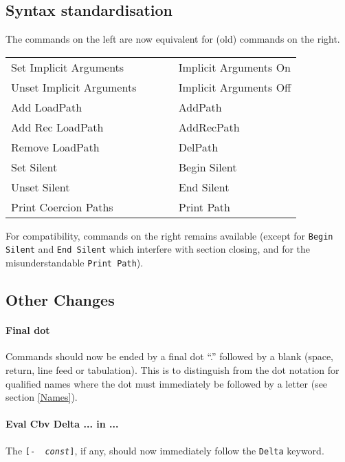 \documentclass[11pt]{article}
\begin{document}
\subsection{Syntax standardisation}

The commands on the left are now equivalent for (old) commands on
the right.

\medskip

\begin{tt}
\begin{tabular}{ll}
Set Implicit Arguments & Implicit Arguments On \\
Unset Implicit Arguments ~~~~~ & Implicit Arguments Off \\
Add LoadPath & AddPath \\
Add Rec LoadPath & AddRecPath \\
Remove LoadPath & DelPath \\
Set Silent & Begin Silent \\
Unset Silent & End Silent \\
Print Coercion Paths & Print Path\\
\end{tabular}
\end{tt}

\medskip

For compatibility, commands on the right remains available (except for
{\tt Begin Silent} and {\tt End Silent} which interfere with
section closing, and for the misunderstandable {\tt Print Path}).

\subsection{Other Changes}


\paragraph{Final dot} Commands should now be ended by a final dot ``.'' followed by a blank
(space, return, line feed or tabulation). This is to distinguish from
the dot notation for qualified names where the dot must immediately be
followed by a letter (see section \ref{Names}).

\paragraph{Eval Cbv Delta ... in ...} The {\tt [- {\it
const}]}, if any, should now immediately follow the {\tt Delta} keyword.
\end{document}
